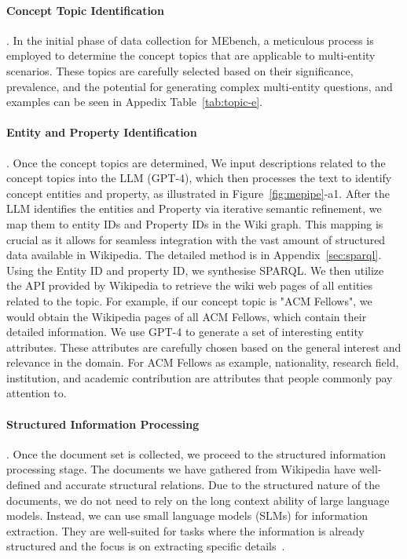\paragraph{Concept Topic Identification}. In the initial phase of data collection for MEbench, a meticulous process is employed to determine the concept topics that are applicable to multi-entity scenarios. These topics are carefully selected based on their significance, prevalence, and the potential for generating complex multi-entity questions, and examples can be seen in Appedix Table~\ref{tab:topic-e}.

\paragraph{Entity and Property Identification}. Once the concept topics are determined, We input descriptions related to the concept topics into the LLM (GPT-4), which then processes the text to identify concept entities and property, as illustrated in Figure~\ref{fig:mepipe}-a1. After the LLM identifies the entities and Property via iterative semantic refinement, we map them to entity IDs and Property IDs in the Wiki graph. This mapping is crucial as it allows for seamless integration with the vast amount of structured data available in Wikipedia. The detailed method is in Appendix~\ref{sec:sparql}. Using the Entity ID and property ID, we synthesise SPARQL. We then utilize the API provided by Wikipedia to retrieve the wiki web pages of all entities related to the topic. For example, if our concept topic is "ACM Fellows", we would obtain the Wikipedia pages of all ACM Fellows, which contain their detailed information. We use GPT-4 to generate a set of interesting entity attributes. These attributes are carefully chosen based on the general interest and relevance in the domain. For ACM Fellows as example, nationality, research field, institution, and academic contribution are attributes that people commonly pay attention to.

\paragraph{Structured Information Processing}. Once the document set is collected, we proceed to the structured information processing stage. The documents we have gathered from Wikipedia have well-defined and accurate structural relations. Due to the structured nature of the documents, we do not need to rely on the long context ability of large language models. Instead, we can use small language models (SLMs) for information extraction. They are well-suited for tasks where the information is already structured and the focus is on extracting specific details~\citep{fan2025minirag}.

